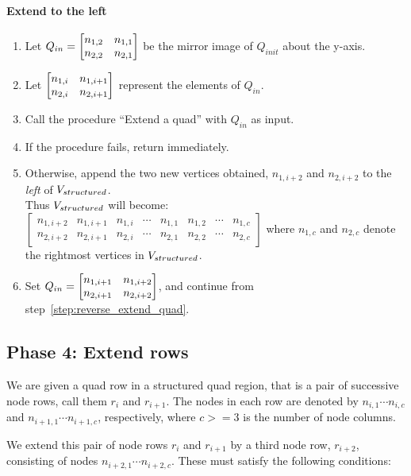 \paragraph{Extend to the left}
\begin{enumerate}[resume]

\item \label{step:init_reverse} Let $Q_{in} = \begin{bmatrix} n_{1,2} & n_{1,1} \\ n_{2,2} & n_{2,1} \end{bmatrix}$ be the mirror image of $Q_{init}$ about the y-axis.



\item \label{step:reverse_extend_quad} Let $\begin{bmatrix} n_{1,i} & n_{1,i+1} \\ n_{2,i} & n_{2,i+1} \end{bmatrix}$ represent the elements of $Q_{in}$.
\item Call the procedure ``Extend a quad'' with $Q_{in}$ as input.
\item If the procedure fails, return immediately.
\item Otherwise, append the two new vertices obtained, $n_{1,i+2}$ and $n_{2,i+2}$ to the \emph{left} of $V_{structured}$. \\
Thus $V_{structured}$ will become:
	$\begin{bmatrix}
	n_{1,i+2} & n_{1,i+1} & n_{1,i} & \cdots & n_{1,1} & n_{1,2} & \cdots  & n_{1,c} \\
	n_{2,i+2} & n_{2,i+1} & n_{2,i} & \cdots & n_{2,1} & n_{2,2} & \cdots  & n_{2,c}
	\end{bmatrix}$
where $n_{1,c}$ and $n_{2,c}$ denote the rightmost vertices in $V_{structured}$.

\item Set $Q_{in} = \begin{bmatrix} n_{1,i+1} & n_{1,i+2} \\ n_{2,i+1} & n_{2,i+2} \end{bmatrix}$, and continue from step~\ref{step:reverse_extend_quad}.
\end{enumerate}






\subsection{Phase 4: Extend rows}
We are given a quad row in a structured quad region, that is a pair of successive node rows, call them $r_i$ and $r_{i+1}$.
The nodes in each row are denoted by $n_{i,1} \cdots n_{i,c}$ and $n_{i+1,1} \cdots n_{i+1,c}$, respectively, where $c >= 3$ is the number of node columns.

We extend this pair of node rows $r_i$ and $r_{i+1}$ by a third node row, $r_{i+2}$, consisting of nodes $n_{i+2,1} \cdots n_{i+2,c}$. These must satisfy the following conditions:

